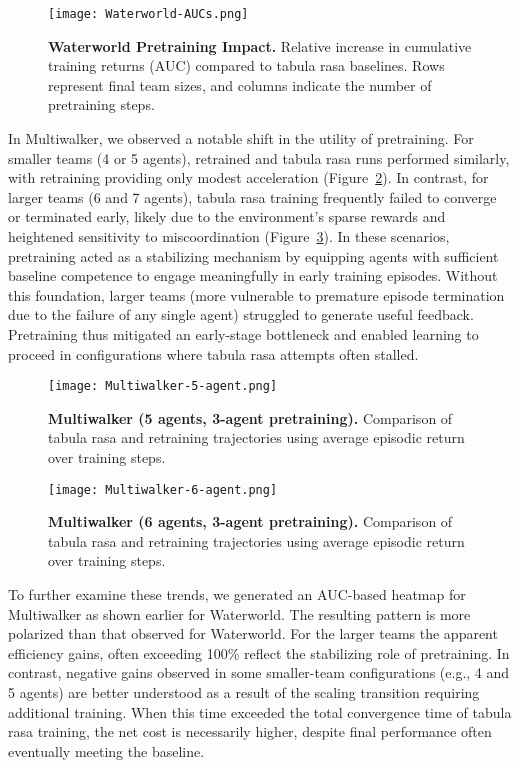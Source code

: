 \documentclass{article}
\begin{document}
\begin{figure}[h]
    \centering
    \texttt{[image: Waterworld-AUCs.png]}
    \caption{\textbf{Waterworld Pretraining Impact.} 
    Relative increase in cumulative training returns (AUC) compared to tabula rasa baselines. 
    Rows represent final team sizes, and columns indicate the number of pretraining steps.}
    \label{fig:waterworld-aucs}
\end{figure}

In Multiwalker, we observed a notable shift in the utility of pretraining. 
For smaller teams (4 or 5 agents), retrained and tabula rasa runs performed similarly, 
with retraining providing only modest acceleration (Figure~\ref{fig:multiwalker-5}). 
In contrast, for larger teams (6 and 7 agents), tabula rasa training frequently failed to 
converge or terminated early, likely due to the environment's sparse rewards and heightened 
sensitivity to miscoordination (Figure~\ref{fig:multiwalker-6}). 
In these scenarios, pretraining acted as a stabilizing mechanism by equipping agents 
with sufficient baseline competence to engage meaningfully in early training episodes. 
Without this foundation, larger teams (more vulnerable to premature episode termination 
due to the failure of any single agent) struggled to generate useful feedback. 
Pretraining thus mitigated an early-stage bottleneck and enabled learning to proceed 
in configurations where tabula rasa attempts often stalled.

\begin{figure}[!h]
    \centering
    \texttt{[image: Multiwalker-5-agent.png]}
    \caption{\textbf{Multiwalker (5 agents, 3-agent pretraining).} Comparison of tabula rasa 
    and retraining trajectories using average episodic return over training steps.}
    \label{fig:multiwalker-5}
\end{figure}

\vspace{2em}

\begin{figure}[!h]
    \centering
    \texttt{[image: Multiwalker-6-agent.png]}
    \caption{\textbf{Multiwalker (6 agents, 3-agent pretraining).} Comparison of tabula rasa 
    and retraining trajectories using average episodic return over training steps.}
    \label{fig:multiwalker-6}
\end{figure}

To further examine these trends, we generated an AUC-based heatmap for Multiwalker as shown 
earlier for Waterworld. The resulting pattern is more polarized than that observed for Waterworld.
For the larger teams the apparent efficiency gains, often exceeding 100\%
reflect the stabilizing role of pretraining.
In contrast, negative gains observed in some smaller-team configurations (e.g., 4 and 5 agents) 
are better understood as a result of the scaling transition requiring additional training. 
When this time exceeded the total convergence time of tabula rasa training, the net cost 
is necessarily higher, despite final performance often eventually meeting the baseline.
\end{document}
